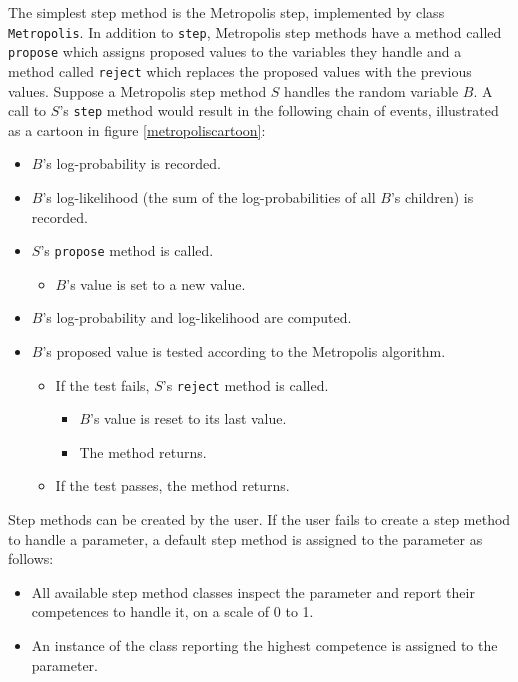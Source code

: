 \documentclass{report}
\begin{document}
The simplest step method is the Metropolis step, implemented by class \texttt{Metropolis}. In addition to \texttt{step}, Metropolis step methods have a method called \texttt{propose} which assigns proposed values to the variables they handle and a method called \texttt{reject} which replaces the proposed values with the previous values. Suppose a Metropolis step method $S$ handles the random variable $B$. A call to $S$'s \texttt{step} method would result in the following chain of events, illustrated as a cartoon in figure \ref{metropoliscartoon}:
\begin{itemize}
    \item $B$'s log-probability is recorded.
    \item $B$'s log-likelihood (the sum of the log-probabilities of all $B$'s children) is recorded.
    \item $S$'s \texttt{propose} method is called.
    \begin{itemize}
        \item $B$'s value is set to a new value.
    \end{itemize}
    \item $B$'s log-probability and log-likelihood are computed.
    \item $B$'s proposed value is tested according to the Metropolis algorithm.
    \begin{itemize}
        \item If the test fails, $S$'s \texttt{reject} method is called.
        \begin{itemize}
            \item $B$'s value is reset to its last value.
            \item The method returns.
        \end{itemize}
        \item If the test passes, the method returns.
    \end{itemize}
\end{itemize}

\bigskip
Step methods can be created by the user. If the user fails to create a step method to handle a parameter, a default step method is assigned to the parameter as follows:
\begin{itemize}
    \item All available step method classes inspect the parameter and report their competences to handle it, on a scale of 0 to 1.
    \item An instance of the class reporting the highest competence is assigned to the parameter.
\end{itemize}
\end{document}
